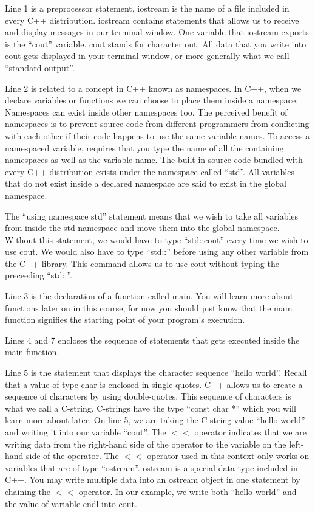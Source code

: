 \documentclass[a4paper,12pt]{article}
\begin{document}
Line 1 is a preprocessor statement, iostream is the name of a file included in every C++ distribution. iostream contains statements that allows us to receive and display messages in our terminal window. One variable that iostream exports is the ``cout'' variable. cout stands for character out. All data that you write into cout gets displayed in your terminal window, or more generally what we call ``standard output''. 

Line 2 is related to a concept in C++ known as namespaces. In C++, when we declare variables or functions we can choose to place them inside a namespace. Namespaces can exist inside other namespaces too. The perceived benefit of namespaces is to prevent source code from different programmers from conflicting with each other if their code happens to use the same variable names. To access a namespaced variable, requires that you type the name of all the containing namespaces as well as the variable name. The built-in source code bundled with every C++ distribution exists under the namespace called ``std''. All variables that do not exist inside a declared namespace are said to exist in the global namespace. 

The ``using namespace std'' statement means that we wish to take all variables from inside the std namespace and move them into the global namespace. Without this statement, we would have to type ``std::cout'' every time we wish to use cout. We would also have to type ``std::'' before using any other variable from the C++ library. This command allows us to use cout without typing the preceeding ``std::''.

Line 3 is the declaration of a function called main. You will learn more about functions later on in this course, for now you should just know that the main function signifies the starting point of your program's execution. 

Lines 4 and 7 encloses the sequence of statements that gets executed inside the main function.

Line 5 is the statement that displays the character sequence ``hello world''. Recall that a value of type char is enclosed in single-quotes. C++ allows us to create a sequence of characters by using double-quotes. This sequence of characters is what we call a C-string. C-strings have the type ``const char *'' which you will learn more about later. On line 5, we are taking the C-string value ``hello world'' and writing it into our variable ``cout''. The $<<$ operator indicates that we are writing data from the right-hand side of the operator to the variable on the left-hand side of the operator. The $<<$ operator used in this context only works on variables that are of type ``ostream''. ostream is a special data type included in C++. You may write multiple data into an ostream object in one statement by chaining the $<<$ operator. In our example, we write both ``hello world'' and the value of variable endl into cout. 
\end{document}
